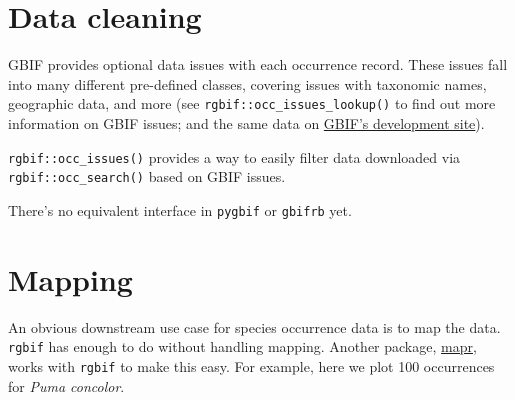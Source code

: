 \documentclass[3p]{elsarticle} %
\newenvironment{Shaded}{\begin{snugshade}}{\end{snugshade}}
\newcommand{\CommentTok}[1]{\textcolor[rgb]{0.56,0.35,0.01}{\textit{#1}}}
\newcommand{\DataTypeTok}[1]{\textcolor[rgb]{0.13,0.29,0.53}{#1}}
\newcommand{\DecValTok}[1]{\textcolor[rgb]{0.00,0.00,0.81}{#1}}
\newcommand{\KeywordTok}[1]{\textcolor[rgb]{0.13,0.29,0.53}{\textbf{#1}}}
\newcommand{\NormalTok}[1]{#1}
\newcommand{\OperatorTok}[1]{\textcolor[rgb]{0.81,0.36,0.00}{\textbf{#1}}}
\newcommand{\OtherTok}[1]{\textcolor[rgb]{0.56,0.35,0.01}{#1}}
\newcommand{\StringTok}[1]{\textcolor[rgb]{0.31,0.60,0.02}{#1}}
\begin{document}
\hypertarget{data-cleaning}{%
\section{Data cleaning}\label{data-cleaning}}

GBIF provides optional data issues with each occurrence record. These
issues fall into many different pre-defined classes, covering issues
with taxonomic names, geographic data, and more (see
\texttt{rgbif::occ\_issues\_lookup()} to find out more information on
GBIF issues; and the same data on
\href{https://gbif.github.io/gbif-api/apidocs/org/gbif/api/vocabulary/OccurrenceIssue.html}{GBIF's
development site}).

\texttt{rgbif::occ\_issues()} provides a way to easily filter data
downloaded via \texttt{rgbif::occ\_search()} based on GBIF issues.

\begin{Shaded}
\end{Shaded}

There's no equivalent interface in \texttt{pygbif} or \texttt{gbifrb}
yet.

\hypertarget{mapping}{%
\section{Mapping}\label{mapping}}

An obvious downstream use case for species occurrence data is to map the
data. \texttt{rgbif} has enough to do without handling mapping. Another
package, \href{https://github.com/ropensci/mapr}{mapr}, works with
\texttt{rgbif} to make this easy. For example, here we plot 100
occurrences for \emph{Puma concolor}.

\begin{Shaded}
\end{Shaded}
\end{document}
